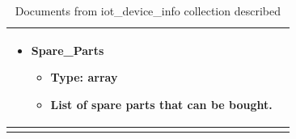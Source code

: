 \begin{center}
\begin{longtable}{ |m{4cm}|m{9cm}| }
\begin{itemize}
\begin{itemize}
        \item Spare{\_}Parts
        \begin{itemize}
            \item Type: array
            \item List of spare parts that can be bought.
        \end{itemize}
    \end{itemize}
  \end{itemize} \\
  \hline
\caption{Documents from iot{\_}device{\_}info collection described}
\end{longtable}
\end{center}